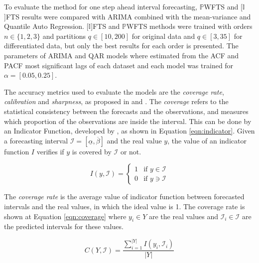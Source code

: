 To evaluate the method for one step ahead interval forecasting, $\mathbb{P}$WFTS and [$\mathbb{I}$]FTS results were compared with ARIMA combined with the mean-variance and Quantile Auto Regression. [$\mathbb{I}$]FTS and $\mathbb{P}$WFTS methods were trained with orders $n \in \{1,2,3\}$ and partitions $q \in [10,200]$ for original data and $q \in [3,35]$ for differentiated data, but only the best results for each order is presented. The parameters of ARIMA and QAR models where estimated from the ACF and PACF most significant lags of each dataset and each model was trained for $\alpha = [0.05, 0.25]$.

The accuracy metrics used to evaluate the models are the \textit{coverage rate}, \textit{calibration} and \textit{sharpness}, as proposed in \cite{Gneiting2007} and \cite{Pinson2006}. The \textit{coverage} refers to the statistical consistency between the forecasts and the observations, and measures which proportion of the observations are inside the interval. This can be done by an Indicator Function, developed by \cite{Christoffersen1998}, as shown in Equation \ref{eqn:indicator}. Given a forecasting interval $\mathcal{I}=[\underline{\alpha},\overline{\beta}]$ and the real value $y$, the value of an indicator function $I$ verifies if $y$ is covered by $\mathcal{I}$ or not.

\begin{equation}
I(y,\mathcal{I}) = \left\{ \begin{array}{cl}
1 & \text{if }y \in \mathcal{I} \\
0 & \text{if }y \ni \mathcal{I} 
\end{array} \right.
\label{eqn:indicator}
\end{equation}


The \textit{coverage rate} is the average value of indicator function between forecasted intervals and the real values, in which the ideal value is 1. The coverage rate is shown at Equation \eqref{eqn:coverage} where $y_i \in Y$ are the real values and $\mathcal{I}_i \in \mathcal{I}$ are the predicted intervals for these values.

\begin{equation}
C(Y,\mathcal{I}) = \frac{\sum_{i = 1 }^{|Y|} I(y_i,\mathcal{I}_i)}{|Y|}
\label{eqn:coverage}
\end{equation}


